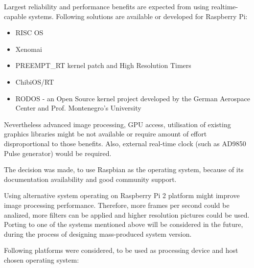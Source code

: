 \documentclass[12pt,twoside,a4paper]{article}
\begin{document}
Largest reliability and performance benefits are expected from using realtime-capable systems.
Following solutions are available or developed for Raspberry Pi:

\begin{itemize}
  \item RISC OS
  \item Xenomai
  \item PREEMPT\_RT kernel patch and High Resolution Timers\cite{stackos}
  \item ChibiOS/RT\cite{chibi}
  \item RODOS - an Open Source kernel project developed by the German Aerospace Center and Prof. Montenegro's University\cite{rodos}
\end{itemize}

Nevertheless advanced image processing, GPU access, utilisation of existing graphics libraries might be not available or require amount of effort disproportional to those benefits.
Also, external real-time clock (such as AD9850 Pulse generator) would be required.

The decision was made, to use Raspbian as the operating system, because of its documentation availability and good community support.

Using alternative system operating on Raspberry Pi 2 platform might improve image processing performance. Therefore, more frames per second could be analized, more filters can be applied and higher resolution pictures could be used.
Porting to one of the systems mentioned above will be considered in the future, during the process of designing mass-produced system version.

Following platforms were considered, to be used as processing device and host chosen operating system:
\end{document}
